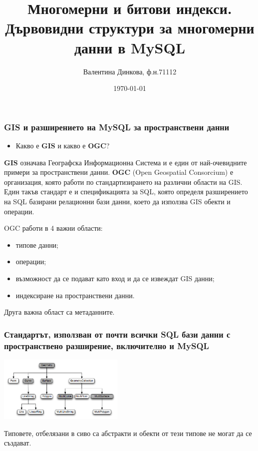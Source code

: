 \documentclass{beamer}
\title[Mногомерни данни в MySQL]{Многомерни и битови индекси. Дървовидни структури за многомерни данни в MySQL}
\author{Валентина Динкова, ф.н.71112}
\institute{ФМИ}
\date{\today}
\begin{document}
\begin{frame}
  \titlepage
\end{frame}

\begin{frame}
  \frametitle{GIS и разширението на MySQL за пространствени данни}
\begin{itemize}
 \item Какво е \textbf{GIS} и какво е \textbf{OGC}?
\end{itemize}
\textbf{GIS} означава Географска Информационна Система и е един от най-очевидните примери за пространствени данни.
\newline
\newline
\textbf{OGC} (Open Geospatial Consorcium) е организация, която работи по стандартизирането на различни области на GIS.
Един такъв стандарт е и спецификацията за SQL, която определя разширението на SQL базирани релационни бази данни,
 което да използва GIS обекти и операции.
\end{frame}

\begin{frame}
 OGC работи в 4 важни области:
\begin{itemize}
 \item типове данни;
 \item операции;
 \item възможност да се подават като вход и да се извеждат GIS данни;
 \item индексиране на пространствени данни.
\end{itemize}
Друга важна област са метаданните.
\end{frame}

\begin{frame}
\frametitle{Стандартът, използван от почти всички SQL бази данни с пространствено разширение, включително и MySQL}
\begin{center}
\includegraphics[width=60mm]{gis-datatypes.png}\end{center}
Типовете, отбелязани в сиво са абстракти и обекти от тези типове не могат да се създават.
\end{frame}
\end{document}
